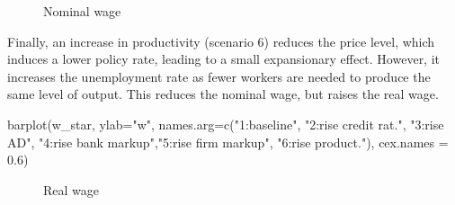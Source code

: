 \documentclass[
  letterpaper,
  DIV=11,
  numbers=noendperiod]{scrreprt}
\newenvironment{Shaded}{\begin{snugshade}}{\end{snugshade}}
\newcommand{\AttributeTok}[1]{\textcolor[rgb]{0.40,0.45,0.13}{#1}}
\newcommand{\FloatTok}[1]{\textcolor[rgb]{0.68,0.00,0.00}{#1}}
\newcommand{\FunctionTok}[1]{\textcolor[rgb]{0.28,0.35,0.67}{#1}}
\newcommand{\NormalTok}[1]{\textcolor[rgb]{0.00,0.23,0.31}{#1}}
\newcommand{\StringTok}[1]{\textcolor[rgb]{0.13,0.47,0.30}{#1}}
\begin{document}
\begin{figure}[H]


\caption{\label{fig-nominal-wage-pkmacro}Nominal wage}

\end{figure}%

Finally, an increase in productivity (scenario 6) reduces the price
level, which induces a lower policy rate, leading to a small
expansionary effect. However, it increases the unemployment rate as
fewer workers are needed to produce the same level of output. This
reduces the nominal wage, but raises the real wage.

\begin{Shaded}
\begin{Highlighting}[]
\FunctionTok{barplot}\NormalTok{(w\_star, }\AttributeTok{ylab=}\StringTok{"w"}\NormalTok{, }\AttributeTok{names.arg=}\FunctionTok{c}\NormalTok{(}\StringTok{"1:baseline"}\NormalTok{, }\StringTok{"2:rise credit rat."}\NormalTok{, }\StringTok{"3:rise AD"}\NormalTok{,}
                                      \StringTok{"4:rise bank markup"}\NormalTok{,}\StringTok{"5:rise firm markup"}\NormalTok{, }\StringTok{"6:rise product."}\NormalTok{), }\AttributeTok{cex.names =} \FloatTok{0.6}\NormalTok{)}
\end{Highlighting}
\end{Shaded}

\begin{figure}[H]


\caption{\label{fig-real-wage-pkmacro}Real wage}

\end{figure}%
\end{document}
